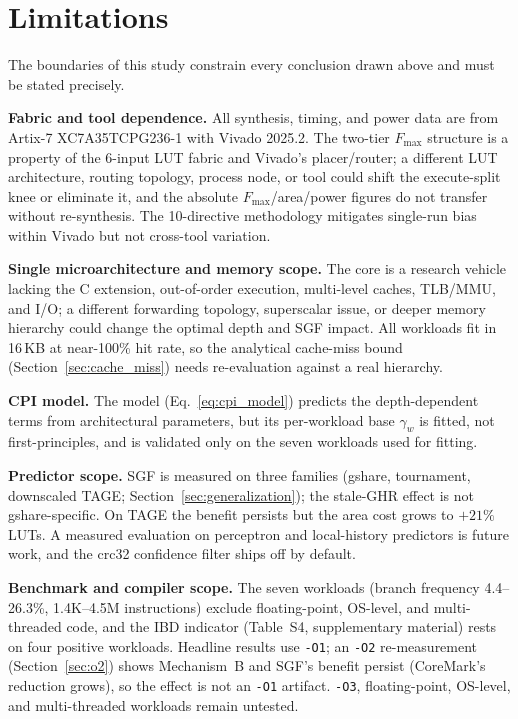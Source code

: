 \documentclass[acmsmall,nonacm,screen]{acmart}
\begin{document}
\section{Limitations}
\label{sec:limitations}

The boundaries of this study constrain every conclusion drawn above and must be stated precisely.

\textbf{Fabric and tool dependence.}
All synthesis, timing, and power data are from Artix-7 XC7A35TCPG236-1 with Vivado 2025.2. The two-tier $F_{\max}$ structure is a property of the 6-input LUT fabric and Vivado's placer/router; a different LUT architecture, routing topology, process node, or tool could shift the execute-split knee or eliminate it, and the absolute $F_{\max}$/area/power figures do not transfer without re-synthesis. The 10-directive methodology mitigates single-run bias within Vivado but not cross-tool variation.

\textbf{Single microarchitecture and memory scope.}
The core is a research vehicle lacking the C extension, out-of-order execution, multi-level caches, TLB/MMU, and I/O; a different forwarding topology, superscalar issue, or deeper memory hierarchy could change the optimal depth and SGF impact. All workloads fit in 16\,KB at near-100\% hit rate, so the analytical cache-miss bound (Section~\ref{sec:cache_miss}) needs re-evaluation against a real hierarchy.

\textbf{CPI model.}
The model (Eq.~\ref{eq:cpi_model}) predicts the depth-dependent terms from architectural parameters, but its per-workload base $\gamma_w$ is fitted, not first-principles, and is validated only on the seven workloads used for fitting.

\textbf{Predictor scope.}
SGF is measured on three families (gshare, tournament, downscaled TAGE; Section~\ref{sec:generalization}); the stale-GHR effect is not gshare-specific. On TAGE \cite{seznec2011tage} the benefit persists but the area cost grows to $+21\%$ LUTs. A measured evaluation on perceptron \cite{jimenez2001dynamic} and local-history \cite{yeh1991two} predictors is future work, and the crc32 confidence filter ships off by default.

\textbf{Benchmark and compiler scope.}
The seven workloads (branch frequency 4.4--26.3\%, 1.4K--4.5M instructions) exclude floating-point, OS-level, and multi-threaded code, and the IBD indicator (Table~S4, supplementary material) rests on four positive workloads. Headline results use \texttt{-O1}; an \texttt{-O2} re-measurement (Section~\ref{sec:o2}) shows Mechanism~B and SGF's benefit persist (CoreMark's reduction grows), so the effect is not an \texttt{-O1} artifact. \texttt{-O3}, floating-point, OS-level, and multi-threaded workloads remain untested.
\end{document}
